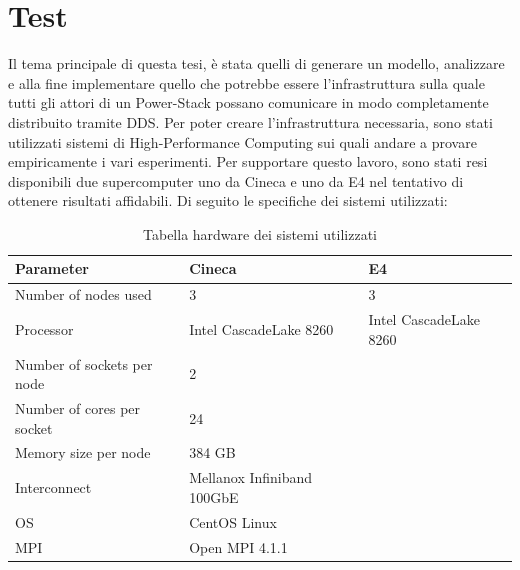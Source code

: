\chapter{Test}
Il tema principale di questa tesi, è stata quelli di generare un modello, analizzare e alla fine implementare quello che potrebbe essere l'infrastruttura sulla quale tutti gli attori di un Power-Stack 
possano comunicare in modo completamente distribuito tramite DDS. Per poter creare l'infrastruttura necessaria, sono stati utilizzati sistemi di High-Performance Computing sui quali andare a provare empiricamente i vari esperimenti. Per supportare questo lavoro, sono stati resi disponibili due supercomputer uno da Cineca\cite{Cineca} e uno da E4\cite{E4} nel tentativo di ottenere risultati affidabili. Di seguito le specifiche dei sistemi utilizzati:

\begin{table}[H]
\begin{center}
\begin{tabular}{l|l|l}
    \hline
    \textbf{Parameter} & \textbf{Cineca} & \textbf{E4} \\
    \hline
    Number of nodes used & 3 & 3\\
    \hline
    Processor & Intel CascadeLake 8260 & Intel CascadeLake 8260  \\
    \hline
    Number of sockets per node & 2 \\
    \hline
    Number of cores per socket & 24 \\
    \hline
    Memory size per node & 384 GB \\
    \hline
    Interconnect & Mellanox Infiniband 100GbE \\
    \hline
    OS & CentOS Linux \\ 
    \hline
    MPI & Open MPI  4.1.1 \\
    \hline
\end{tabular}
\end{center}
\caption{Tabella hardware dei sistemi utilizzati}
\label{table:hpc-cineca}
\end{table}


